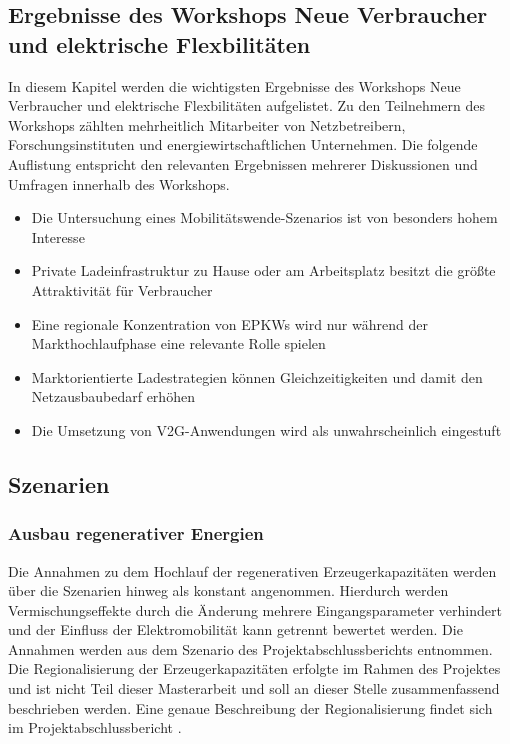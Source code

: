 \subsection{Ergebnisse des Workshops \glqq Neue Verbraucher und elektrische Flexbilitäten\grqq{}}

In diesem Kapitel werden die wichtigsten Ergebnisse des Workshops \glqq Neue Verbraucher und elektrische Flexbilitäten\grqq{} aufgelistet.
Zu den Teilnehmern des Workshops zählten mehrheitlich Mitarbeiter von Netzbetreibern, Forschungsinstituten und energiewirtschaftlichen Unternehmen.
Die folgende Auflistung entspricht den relevanten Ergebnissen mehrerer Diskussionen und Umfragen innerhalb des Workshops.

\begin{itemize}
	\item Die Untersuchung eines Mobilitätswende-Szenarios ist von besonders hohem Interesse
	\item Private Ladeinfrastruktur zu Hause oder am Arbeitsplatz besitzt die größte Attraktivität für Verbraucher
	\item Eine regionale Konzentration von \glspl{EPKW} wird nur während der Markthochlaufphase eine relevante Rolle spielen
	\item Marktorientierte Ladestrategien können Gleichzeitigkeiten und damit den Netzausbaubedarf erhöhen
	\item Die Umsetzung von \gls{V2G}-Anwendungen wird als unwahrscheinlich eingestuft
	
\end{itemize}


\subsection{Szenarien}

\subsubsection{Ausbau regenerativer Energien}

Die Annahmen zu dem Hochlauf der regenerativen Erzeugerkapazitäten werden über die Szenarien hinweg als konstant angenommen.
Hierdurch werden Vermischungseffekte durch die Änderung mehrere Eingangsparameter verhindert und der Einfluss der Elektromobilität kann getrennt bewertet werden.
Die Annahmen werden aus dem Szenario \ego des \openego Projektabschlussberichts \cite{Mueller2019} entnommen.
Die Regionalisierung der Erzeugerkapazitäten erfolgte im Rahmen des \openego Projektes und ist nicht Teil dieser Masterarbeit und soll an dieser Stelle zusammenfassend beschrieben werden.
Eine genaue Beschreibung der Regionalisierung findet sich im \openego Projektabschlussbericht \cite{Mueller2019}.\medskip

